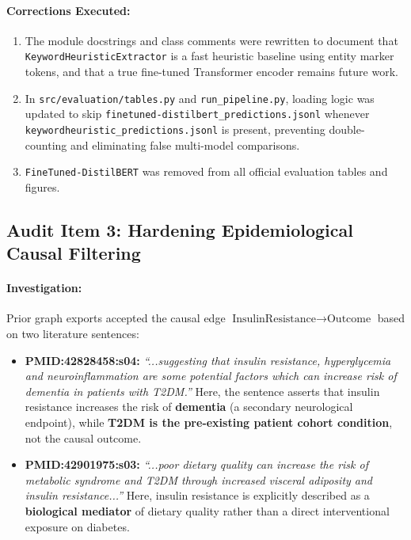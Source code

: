 \documentclass[11pt,a4paper]{article}
\begin{document}
\paragraph{Corrections Executed:}
\begin{enumerate}[leftmargin=1.5em]
    \item The module docstrings and class comments were rewritten to document that \texttt{KeywordHeuristicExtractor} is a fast heuristic baseline using entity marker tokens, and that a true fine-tuned Transformer encoder remains future work.
    \item In \texttt{src/evaluation/tables.py} and \texttt{run\_pipeline.py}, loading logic was updated to skip \texttt{finetuned-distilbert\_predictions.jsonl} whenever \texttt{keywordheuristic\_predictions.jsonl} is present, preventing double-counting and eliminating false multi-model comparisons.
    \item \texttt{FineTuned-DistilBERT} was removed from all official evaluation tables and figures.
\end{enumerate}

\subsection{Audit Item 3: Hardening Epidemiological Causal Filtering}
\paragraph{Investigation:} Prior graph exports accepted the causal edge $\text{InsulinResistance} \rightarrow \text{Outcome}$ based on two literature sentences:
\begin{itemize}[leftmargin=1.5em]
    \item \textbf{PMID:42828458:s04:} \textit{``...suggesting that insulin resistance, hyperglycemia and neuroinflammation are some potential factors which can increase risk of dementia in patients with T2DM.''}  
    Here, the sentence asserts that insulin resistance increases the risk of \textbf{dementia} (a secondary neurological endpoint), while \textbf{T2DM is the pre-existing patient cohort condition}, not the causal outcome.
    \item \textbf{PMID:42901975:s03:} \textit{``...poor dietary quality can increase the risk of metabolic syndrome and T2DM through increased visceral adiposity and insulin resistance...''}  
    Here, insulin resistance is explicitly described as a \textbf{biological mediator} of dietary quality rather than a direct interventional exposure on diabetes.
\end{itemize}
\end{document}

